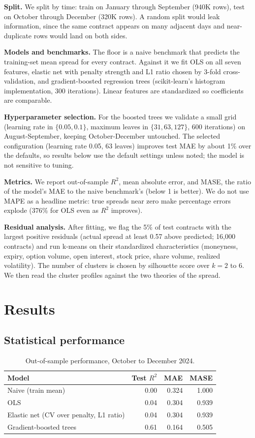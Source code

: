 \documentclass[11pt]{article}
\begin{document}
\textbf{Split.} We split by time: train on January through September (940K
rows), test on October through December (320K rows). A random split would leak
information, since the same contract appears on many adjacent days and
near-duplicate rows would land on both sides.

\textbf{Models and benchmarks.} The floor is a naive benchmark that predicts
the training-set mean spread for every contract. Against it we fit OLS on all
seven features, elastic net with penalty strength and L1 ratio chosen by
3-fold cross-validation, and gradient-boosted regression trees
(scikit-learn's histogram implementation, 300 iterations). Linear features are
standardized so coefficients are comparable.

\textbf{Hyperparameter selection.} For the boosted trees we validate a small
grid (learning rate in $\{0.05, 0.1\}$, maximum leaves in $\{31, 63, 127\}$,
600 iterations) on August-September, keeping October-December untouched. The
selected configuration (learning rate 0.05, 63 leaves) improves test MAE by
about 1\% over the defaults, so results below use the default settings unless
noted; the model is not sensitive to tuning.

\textbf{Metrics.} We report out-of-sample $R^2$, mean absolute error, and
MASE, the ratio of the model's MAE to the naive benchmark's (below 1 is
better). We do not use MAPE as a headline metric: true spreads near zero make
percentage errors explode (376\% for OLS even as $R^2$ improves).

\textbf{Residual analysis.} After fitting, we flag the 5\% of test contracts
with the largest positive residuals (actual spread at least 0.57 above
predicted; 16,000 contracts) and run k-means on their standardized
characteristics (moneyness, expiry, option volume, open interest, stock
price, share volume, realized volatility). The number of clusters is chosen
by silhouette score over $k = 2$ to $6$. We then read the cluster profiles
against the two theories of the spread.

\section{Results}

\subsection{Statistical performance}

\begin{table}[H]
\centering
\caption{Out-of-sample performance, October to December 2024.}
\begin{tabular}{lrrr}
\toprule
Model & Test $R^2$ & MAE & MASE \\
\midrule
Naive (train mean) & 0.00 & 0.324 & 1.000 \\
OLS & 0.04 & 0.304 & 0.939 \\
Elastic net (CV over penalty, L1 ratio) & 0.04 & 0.304 & 0.939 \\
Gradient-boosted trees & 0.61 & 0.164 & 0.505 \\
\bottomrule
\end{tabular}
\label{tab:models}
\end{table}
\end{document}
